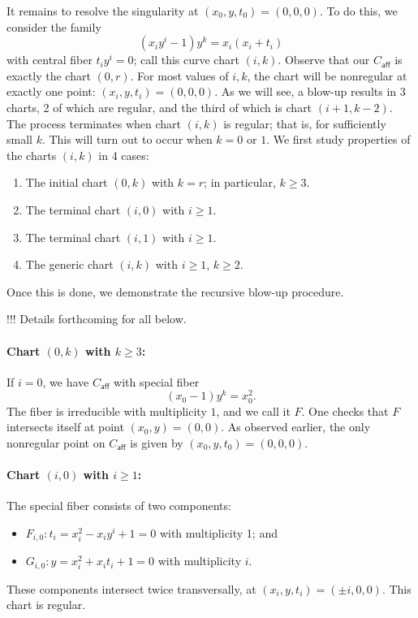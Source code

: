 \documentclass[pagesize,paper=letter]{scrartcl}
\newcommand{\caff}{C_{\textsf{aff}}}
\theoremstyle{plain}
\theoremstyle{definition}
\theoremstyle{remark}
\begin{document}
It remains to resolve the singularity at $(x_0, y, t_0) = (0, 0, 0)$. To do this, we consider the family
\[
(x_iy^i - 1) y^k = x_i(x_i + t_i)
\]
with central fiber $t_iy^i = 0$; call this curve chart $(i,k)$. Observe that our $\caff$ is exactly the chart $(0,r)$. For most values of $i, k$, the chart will be nonregular at exactly one point: $(x_i, y, t_i) = (0, 0, 0)$. As we will see, a blow-up results in 3 charts, 2 of which are regular, and the third of which is chart $(i+1, k-2)$. The process terminates when chart $(i, k)$ is regular; that is, for sufficiently small $k$. This will turn out to occur when $k = 0$ or $1$. We first study properties of the charts $(i, k)$ in 4 cases:
\begin{enumerate}
    \item The initial chart $(0, k)$ with $k = r$; in particular, $k \geq 3$.
    \item The terminal chart $(i, 0)$ with $i \geq 1$.
    \item The terminal chart $(i, 1)$ with $i \geq 1$.
    \item The generic chart $(i, k)$ with $i \geq 1$, $k \geq 2$.
\end{enumerate}
Once this is done, we demonstrate the recursive blow-up procedure.

!!! Details forthcoming for all below.

\paragraph{Chart $(0, k)$ with $k \geq 3$:}
\label{sec:case-i=0}

If $i = 0$, we have $\caff$ with special fiber
\[
(x_0 - 1) y^k = x_0^2.
\]
The fiber is irreducible with multiplicity $1$, and we call it $F$. One checks that $F$ intersects itself at point $(x_0, y) = (0, 0)$. As observed earlier, the only nonregular point on $\caff$ is given by $(x_0, y, t_0) = (0, 0, 0)$.

\paragraph{Chart $(i, 0)$ with $i \geq 1$:}
\label{sec:case-k=0}

The special fiber consists of two components:
\begin{itemize}
    \item $F_{i,0}: t_i = x_i^2 - x_iy^i + 1 = 0$ with multiplicity 1; and
    \item $G_{i,0}: y = x_i^2 + x_it_i + 1 = 0$ with multiplicity $i$.
\end{itemize}
These components intersect twice transversally, at $(x_i, y, t_i) = (\pm i, 0, 0)$. This chart is regular.
\end{document}
